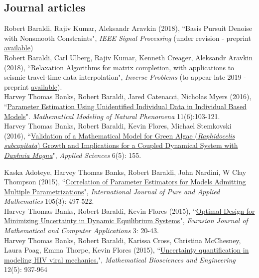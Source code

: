 \documentclass[10pt, a4paper]{article}
\newcommand{\years}[1]{\marginnote{\scriptsize #1}}
\begin{document}
\subsection*{Journal articles}
\noindent
\years{2018} Robert Baraldi, Rajiv Kumar, Aleksandr Aravkin  (2018), “Basis Pursuit Denoise with Nonsmooth Constraints", \emph{IEEE Signal Processing} (under revision - preprint \href{https://arxiv.org/abs/1811.11633}{available})\\
\years{2018a} Robert Baraldi, Carl Ulberg, Rajiv Kumar, Kenneth Creager, Aleksandr Aravkin (2018), “Relaxation Algorithms for matrix completion, with applications to seismic travel-time data interpolation", \emph{Inverse Problems} (to appear late 2019 - preprint \href{https://arxiv.org/abs/1808.04515}{available}).\\
\years{2016a} Harvey Thomas Banks, Robert Baraldi, Jared Catenacci, Nicholas Myers (2016), “\href{https://www.ncsu.edu/crsc/reports/ftp/pdf/crsc-tr16-04.pdf}{Parameter Estimation Using Unidentified Individual Data in Individual Based Models}". \emph{Mathematical Modeling of Natural Phenomena} 11(6):103-121.\\
\years{2016b} Harvey Thomas Banks, Robert Baraldi, Kevin Flores, Michael Stemkovski (2016), “\href{http://www.mdpi.com/2076-3417/6/5/155/htm}{Validation of a Mathematical Model for Green Algae (\emph{Raphidocelis subcapitata}) Growth and Implications for a Coupled Dynamical System with \emph{Daphnia Magna}}", \emph{Applied Sciences} 6(5): 155. 

\years{2015a}Kaska Adoteye, Harvey Thomas Banks, Robert Baraldi, John Nardini, W Clay Thompson (2015), “\href{http://www.ijpam.eu/contents/2015-105-3/16/16.pdf}{Correlation of Parameter Estimators for Models Admitting Multiple Parametrizations}", \emph{International Journal of Pure and Applied Mathematics} 105(3): 497-522.\\
\years{2015b}Harvey Thomas Banks, Robert Baraldi, Kevin Flores (2015), “\href{http://www.ncsu.edu/crsc/reports/ftp/pdf/crsc-tr15-03.pdf}{Optimal Design for Minimizing Uncertainty in Dynamic Equilibrium Systems}", \emph{Eurasian Journal of Mathematical and Computer Applications} 3: 20-43.\\
\years{2015c}Harvey Thomas Banks, Robert Baraldi, Karissa Cross, Christina McChesney, Laura Poag, Emma Thorpe, Kevin Flores (2015), “\href{http://aimsciences.org/journals/displayArticlesnew.jsp?paperID=11300}{Uncertainty quantification in modeling HIV viral mechanics.}", \emph{Mathematical Biosciences and Engineering} 12(5): 937-964\\
\end{document}
